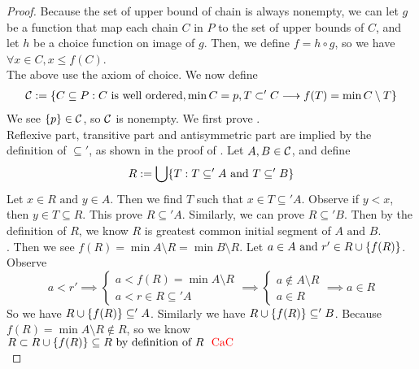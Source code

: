 \documentclass{report}
\begin{document}
\begin{proof}
Because the set of upper bound of chain is always nonempty, we can let $g$ be a function that map each chain $C$ in  $P$ to the set of upper bounds of $C$, and let $h$ be a choice function on image of $g$. Then, we define $f=h\circ g$, so we have  $\forall x \in C, x\leq f(C)$.\\

The above use the axiom of choice. We now define 
\begin{multline}
\mathcal{C}:=\{ C\subseteq P: C\text{ is well ordered},\min C=p,T\subset' C\longrightarrow f(T)=\min C\setminus T \}
\end{multline}
We see $\{ p \}\in \mathcal{C}$, so $\mathcal{C}$ is nonempty. We first prove .\\

Reflexive part, transitive part and antisymmetric part are implied by the definition of $\subseteq'$, as shown in the proof of . Let $A,B \in \mathcal{C}$, and define
\begin{equation}
R:=\bigcup \{ T: T \subseteq' A\text{ and }T\subseteq' B \}
\end{equation}
Let $x\in R\text{ and }y \in A$. Then we find $T$ such that $x \in T\subseteq' A$. Observe if $y<x$, then $y\in T \subseteq R$. This prove $R\subseteq' A$. Similarly, we can prove $R\subseteq' B$. Then by the definition of $R$, we know  $R$ is greatest common initial segment of  $A\text{ and }B$.\\

. Then we see $f(R)=\min A\setminus R=\min B\setminus R$. Let $a\in A\text{ and }r'\in R\cup \{ f(R) \}$. Observe
\begin{equation}
a<r' \implies \begin{cases}
  a<f(R)=\min A\setminus R\\
  a<r \in R\subseteq' A
\end{cases}\implies \begin{cases}
  a \not\in A\setminus R\\
  a \in R
\end{cases}\implies a\in R
\end{equation}
So we have $R\cup \{ f(R) \}\subseteq' A$. Similarly we have $R\cup \{ f(R) \}\subseteq' B$. Because $f(R)=\min A\setminus R\not\in R$, so we know $R\subset R\cup \{ f(R) \}\subseteq R\text{ by definition of $R$ }\text{ \textcolor{red}{CaC} }$\\


\end{proof}
\end{document}
